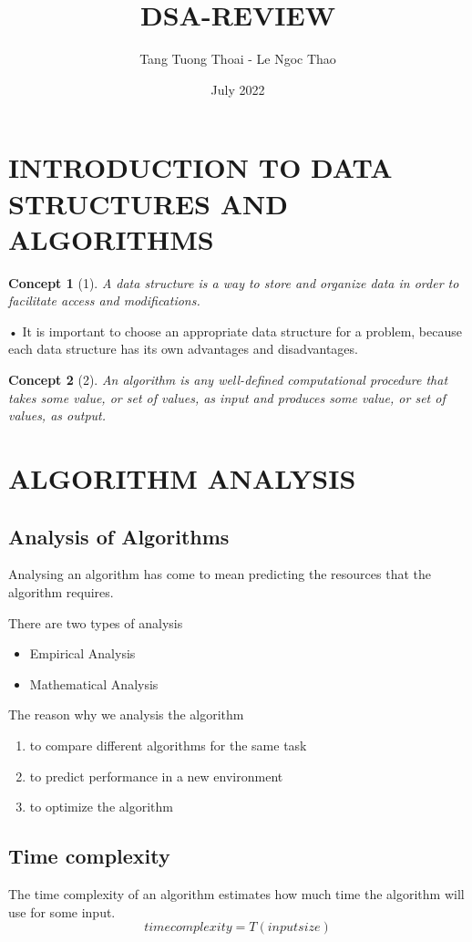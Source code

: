 \documentclass{article}
\title{DSA-REVIEW}
\author{Tang Tuong Thoai - Le Ngoc Thao}
\date{July 2022}
\newtheorem*{concept}{Concept}
\begin{document}
\maketitle

\section{INTRODUCTION TO DATA STRUCTURES AND ALGORITHMS}
\begin{concept}[1]
    A data structure is a way to store and organize data in order to facilitate access and modifications.
\end{concept}



• It is important to choose an appropriate data structure for a problem,
because each data structure has its own advantages and disadvantages.

\begin{concept}[2]
   An algorithm is any well-defined computational procedure that takes some value, or set of values, as input and produces some value, or set of values, as output.
\end{concept}



\section{ALGORITHM ANALYSIS}
\subsection{Analysis of Algorithms} 
Analysing an algorithm has come to mean predicting the resources that the algorithm requires.

There are two types of analysis
\begin{itemize}
    \item Empirical Analysis
    \item Mathematical Analysis
\end{itemize}

The reason why we analysis the algorithm
\begin{enumerate}
    \item to compare different algorithms for the same task
    \item to predict performance in a new environment
    \item to optimize the algorithm
\end{enumerate}

\subsection{Time complexity}
The time complexity of an algorithm estimates how much time the algorithm will use for some input. 
\begin{equation}
    time complexity = T(input size) 
\end{equation}    
    
\end{document}
